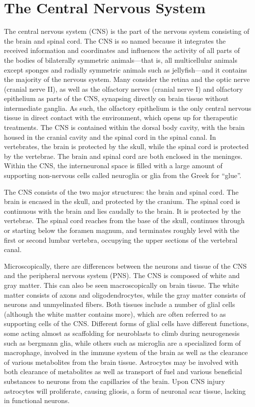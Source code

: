 \hypertarget{the-central-nervous-system}{%
\chapter{The Central Nervous System}\label{the-central-nervous-system}}

The central nervous system (CNS) is the part of the nervous system consisting of the brain and spinal cord. The CNS is so named because it integrates the received information and coordinates and influences the activity of all parts of the bodies of bilaterally symmetric animals---that is, all multicellular animals except sponges and radially symmetric animals such as jellyfish---and it contains the majority of the nervous system. Many consider the retina and the optic nerve (cranial nerve II), as well as the olfactory nerves (cranial nerve I) and olfactory epithelium as parts of the CNS, synapsing directly on brain tissue without intermediate ganglia. As such, the olfactory epithelium is the only central nervous tissue in direct contact with the environment, which opens up for therapeutic treatments. The CNS is contained within the dorsal body cavity, with the brain housed in the cranial cavity and the spinal cord in the spinal canal. In vertebrates, the brain is protected by the skull, while the spinal cord is protected by the vertebrae. The brain and spinal cord are both enclosed in the meninges. Within the CNS, the interneuronal space is filled with a large amount of supporting non-nervous cells called neuroglia or glia from the Greek for ``glue''.

The CNS consists of the two major structures: the brain and spinal cord. The brain is encased in the skull, and protected by the cranium. The spinal cord is continuous with the brain and lies caudally to the brain. It is protected by the vertebrae. The spinal cord reaches from the base of the skull, continues through or starting below the foramen magnum, and terminates roughly level with the first or second lumbar vertebra, occupying the upper sections of the vertebral canal.

Microscopically, there are differences between the neurons and tissue of the CNS and the peripheral nervous system (PNS). The CNS is composed of white and gray matter. This can also be seen macroscopically on brain tissue. The white matter consists of axons and oligodendrocytes, while the gray matter consists of neurons and unmyelinated fibers. Both tissues include a number of glial cells (although the white matter contains more), which are often referred to as supporting cells of the CNS. Different forms of glial cells have different functions, some acting almost as scaffolding for neuroblasts to climb during neurogenesis such as bergmann glia, while others such as microglia are a specialized form of macrophage, involved in the immune system of the brain as well as the clearance of various metabolites from the brain tissue. Astrocytes may be involved with both clearance of metabolites as well as transport of fuel and various beneficial substances to neurons from the capillaries of the brain. Upon CNS injury astrocytes will proliferate, causing gliosis, a form of neuronal scar tissue, lacking in functional neurons.


